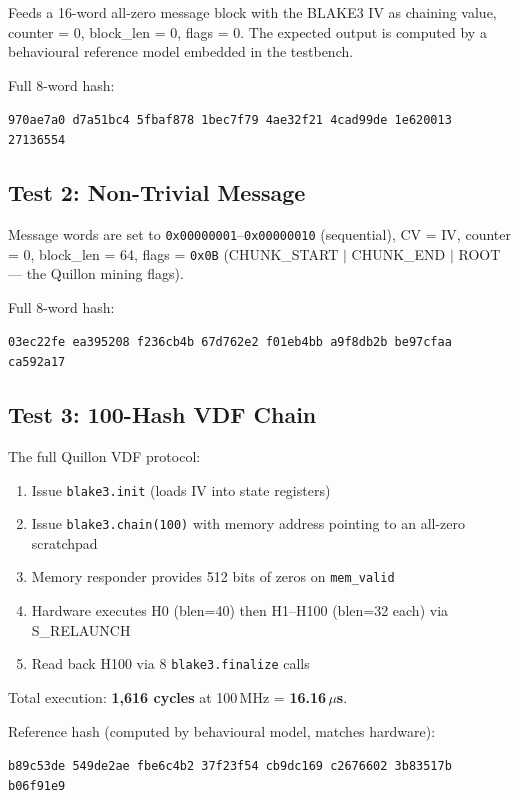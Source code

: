 \documentclass[11pt,a4paper]{article}
\begin{document}
Feeds a 16-word all-zero message block with the BLAKE3 IV as chaining
value, counter = 0, block\_len = 0, flags = 0. The expected output is
computed by a behavioural reference model embedded in the testbench.

Full 8-word hash:
\begin{center}
\texttt{970ae7a0 d7a51bc4 5fbaf878 1bec7f79 4ae32f21 4cad99de 1e620013 27136554}
\end{center}

\subsection{Test 2: Non-Trivial Message}

Message words are set to \texttt{0x00000001}--\texttt{0x00000010}
(sequential), CV = IV, counter = 0, block\_len = 64, flags = \texttt{0x0B}
(CHUNK\_START $|$ CHUNK\_END $|$ ROOT --- the Quillon mining flags).

Full 8-word hash:
\begin{center}
\texttt{03ec22fe ea395208 f236cb4b 67d762e2 f01eb4bb a9f8db2b be97cfaa ca592a17}
\end{center}

\subsection{Test 3: 100-Hash VDF Chain}

The full Quillon VDF protocol:
\begin{enumerate}[noitemsep]
  \item Issue \texttt{blake3.init} (loads IV into state registers)
  \item Issue \texttt{blake3.chain(100)} with memory address pointing to an all-zero scratchpad
  \item Memory responder provides 512 bits of zeros on \texttt{mem\_valid}
  \item Hardware executes H0 (blen=40) then H1--H100 (blen=32 each) via S\_RELAUNCH
  \item Read back H100 via 8 \texttt{blake3.finalize} calls
\end{enumerate}

Total execution: \textbf{1{,}616 cycles} at 100\,MHz = \textbf{16.16\,$\mu$s}.

Reference hash (computed by behavioural model, matches hardware):
\begin{center}
\texttt{b89c53de 549de2ae fbe6c4b2 37f23f54 cb9dc169 c2676602 3b83517b b06f91e9}
\end{center}
\end{document}

